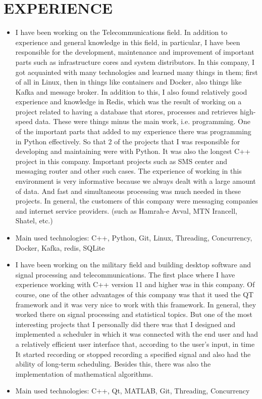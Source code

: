 \documentclass[11pt,a4paper,roman]{moderncv}
\begin{document}
\section{EXPERIENCE}
{
{\begin{itemize}
  \item  I have been working on the Telecommunications field. In addition to experience and general knowledge in this field, in particular, I have been responsible for the development, maintenance and improvement of important parts such as infrastructure cores and system distributors.
  In this company, I got acquainted with many technologies and learned many things in them; first of all in Linux, then in things like containers and Docker, also things like Kafka and message broker. In addition to this, I also found relatively good experience and knowledge in Redis, which was the result of working on a project related to having a database that stores, processes and retrieves high-speed data.
These were things minus the main work, i.e. programming. One of the important parts that added to my experience there was programming in Python effectively. So that 2 of the projects that I was responsible for developing and maintaining were with Python.
It was also the longest C++ project in this company. Important projects such as SMS center and messaging router and other such cases.
The experience of working in this environment is very informative because we always dealt with a large amount of data. And fast and simultaneous processing was much needed in these projects.
In general, the customers of this company were messaging companies and internet service providers. (such as Hamrah-e Avval, MTN Irancell, Shatel, etc.)
\item Main used technologies: C++, Python, Git, Linux, Threading, Concurrency, Docker, Kafka, redis, SQLite
\end{itemize}
}
}


{
{\begin{itemize}
  \item  I have been working on the military field and building desktop software and signal processing and telecommunications.
  The first place where I have experience working with C++ version 11 and higher was in this company.
Of course, one of the other advantages of this company was that it used the QT framework and it was very nice to work with this framework.
In general, they worked there on signal processing and statistical topics.
But one of the most interesting projects that I personally did there was that I designed and implemented a scheduler in which it was connected with the end user and had a relatively efficient user interface that, according to the user's input, in time It started recording or stopped recording a specified signal and also had the ability of long-term scheduling.
Besides this, there was also the implementation of mathematical algorithms.
\item Main used technologies: C++, Qt, MATLAB, Git, Threading, Concurrency
\end{itemize}
}
}
\end{document}
